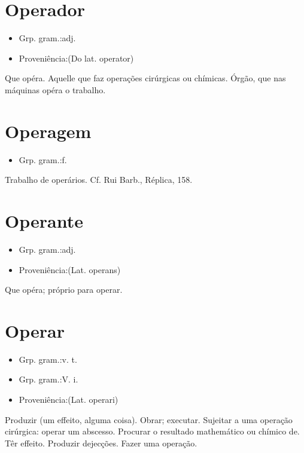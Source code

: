 \section{Operador}
\begin{itemize}
\item {Grp. gram.:adj.}
\end{itemize}
\begin{itemize}
\item {Proveniência:(Do lat. \textunderscore operator\textunderscore )}
\end{itemize}
Que opéra.
Aquelle que faz operações cirúrgicas ou chímicas.
Órgão, que nas máquinas opéra o trabalho.
\section{Operagem}
\begin{itemize}
\item {Grp. gram.:f.}
\end{itemize}
Trabalho de operários. Cf. Rui Barb., \textunderscore Réplica\textunderscore , 158.
\section{Operante}
\begin{itemize}
\item {Grp. gram.:adj.}
\end{itemize}
\begin{itemize}
\item {Proveniência:(Lat. \textunderscore operans\textunderscore )}
\end{itemize}
Que opéra; próprio para operar.
\section{Operar}
\begin{itemize}
\item {Grp. gram.:v. t.}
\end{itemize}
\begin{itemize}
\item {Grp. gram.:V. i.}
\end{itemize}
\begin{itemize}
\item {Proveniência:(Lat. \textunderscore operari\textunderscore )}
\end{itemize}
Produzir (um effeito, alguma coisa).
Obrar; executar.
Sujeitar a uma operação cirúrgica: \textunderscore operar um abscesso\textunderscore .
Procurar o resultado mathemático ou chímico de.
Têr effeito.
Produzir dejecções.
Fazer uma operação.
